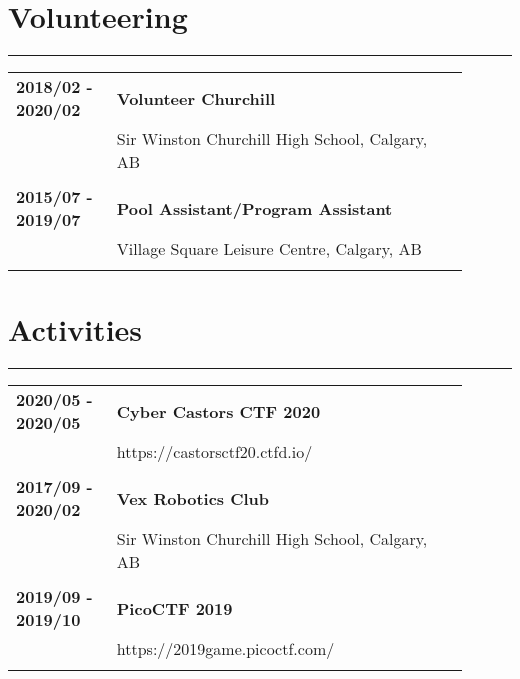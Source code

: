 \documentclass[letterpaper]{article}
\newcommand{\horizontalLine}{%
    \rule{\linewidth}{0.4pt}
    \vspace{1ex}
}
\begin{document}
    \section*{Volunteering}

        \horizontalLine

        \begin{tabular}{p{0.2\linewidth} p{0.7\linewidth}} 
            \textbf{2018/02 - 2020/02} & \large\textbf{Volunteer Churchill} \\
            & Sir Winston Churchill High School, Calgary, AB \\
            \\
            \textbf{2015/07 - 2019/07} & \large\textbf{Pool Assistant/Program Assistant} \\
            & Village Square Leisure Centre, Calgary, AB \\
            \\
        \end{tabular}

    \section*{Activities}

        \horizontalLine

        \begin{tabular}{p{0.2\linewidth} p{0.7\linewidth}} 
            \textbf{2020/05 - 2020/05} & \large\textbf{Cyber Castors CTF 2020} \\
            & https://castorsctf20.ctfd.io/ \\
            \\
            \textbf{2017/09 - 2020/02} & \large\textbf{Vex Robotics Club} \\
            & Sir Winston Churchill High School, Calgary, AB \\
            \\
            \textbf{2019/09 - 2019/10} & \large\textbf{PicoCTF 2019} \\
            & https://2019game.picoctf.com/ \\
            \\
        \end{tabular}
\end{document}
